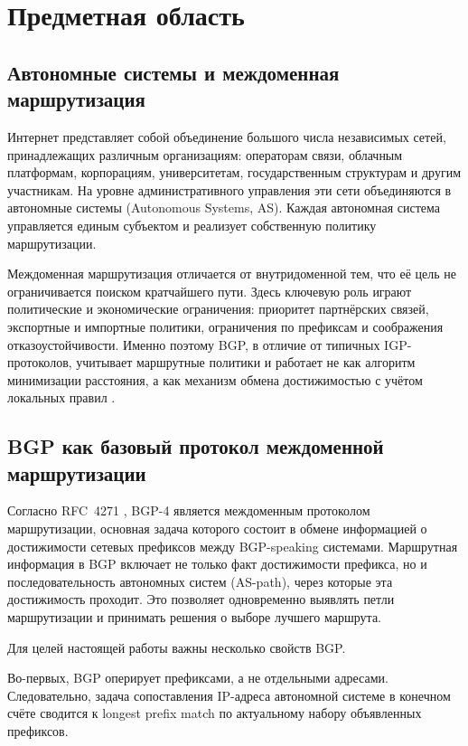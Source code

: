 \section{Предметная область}
\label{sec:bgp-domain}

\subsection{Автономные системы и междоменная маршрутизация}

Интернет представляет собой объединение большого числа независимых
сетей, принадлежащих различным организациям: операторам связи, облачным
платформам, корпорациям, университетам, государственным структурам и
другим участникам. На уровне административного управления эти сети
объединяются в автономные системы (Autonomous Systems, AS). Каждая
автономная система управляется единым субъектом и реализует собственную
политику маршрутизации.

Междоменная маршрутизация отличается от внутридоменной тем, что её цель
не ограничивается поиском кратчайшего пути. Здесь ключевую роль играют
политические и экономические ограничения: приоритет партнёрских связей,
экспортные и импортные политики, ограничения по префиксам и
соображения отказоустойчивости. Именно поэтому BGP, в отличие от
типичных IGP-протоколов, учитывает маршрутные политики и работает не как
алгоритм минимизации расстояния, а как механизм обмена достижимостью с
учётом локальных правил
\cite{rfc4271,griffin2002stablepaths}.

\subsection{BGP как базовый протокол междоменной маршрутизации}

Согласно RFC~4271 \cite{rfc4271}, BGP-4 является междоменным протоколом
маршрутизации, основная задача которого состоит в обмене информацией о
достижимости сетевых префиксов между BGP-speaking системами.
Маршрутная информация в BGP включает не только факт достижимости
префикса, но и последовательность автономных систем (AS-path), через
которые эта достижимость проходит. Это позволяет одновременно выявлять
петли маршрутизации и принимать решения о выборе лучшего
маршрута.

Для целей настоящей работы важны несколько свойств BGP.

Во-первых, BGP оперирует префиксами, а не отдельными адресами.
Следовательно, задача сопоставления IP-адреса автономной системе в
конечном счёте сводится к longest prefix match по актуальному набору
объявленных префиксов.

